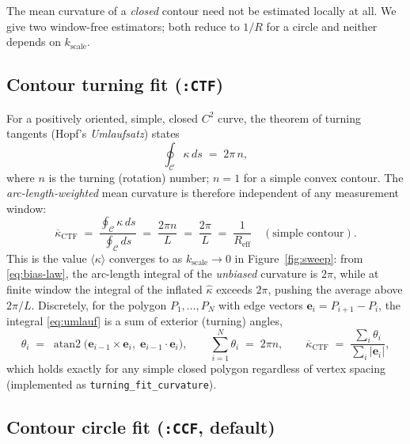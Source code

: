 \documentclass[11pt]{article}
\newcommand{\kbar}{\overline{\kappa}}
\newcommand{\code}[1]{\texttt{#1}}
\begin{document}
The mean curvature of a \emph{closed} contour need not be estimated locally at
all. We give two window-free estimators; both reduce to $1/R$ for a circle and
neither depends on $k_{\text{scale}}$.

\subsection{Contour turning fit (\texttt{:CTF})}
\label{sec:ctf}

For a positively oriented, simple, closed $C^2$ curve, the theorem of turning
tangents (Hopf's \emph{Umlaufsatz}) states
\begin{equation}
  \oint_{\mathcal{C}} \kappa \, ds \;=\; 2\pi\, n,
  \label{eq:umlauf}
\end{equation}
where $n$ is the turning (rotation) number; $n=1$ for a simple convex contour.
The \emph{arc-length-weighted} mean curvature is therefore independent of any
measurement window:
\begin{equation}
  \boxed{\;
  \kbar_{\text{CTF}} \;=\; \frac{\oint_{\mathcal{C}}\kappa\,ds}{\oint_{\mathcal{C}} ds}
        \;=\; \frac{2\pi n}{L}
        \;=\; \frac{2\pi}{L}
        \;=\; \frac{1}{R_{\text{eff}}}
  \quad(\text{simple contour}).
  \;}
  \label{eq:kbar}
\end{equation}
This is the value $\langle\kappa\rangle$ converges to as $k_{\text{scale}}\to 0$
in Figure~\ref{fig:sweep}: from \eqref{eq:bias-law}, the arc-length integral of
the \emph{unbiased} curvature is $2\pi$, while at finite window the integral of
the inflated $\widehat\kappa$ exceeds $2\pi$, pushing the average above $2\pi/L$.
Discretely, for the polygon $P_1,\dots,P_N$ with edge vectors
$\mathbf{e}_i = P_{i+1}-P_i$, the integral \eqref{eq:umlauf} is a sum of exterior
(turning) angles,
\begin{equation}
  \theta_i \;=\; \operatorname{atan2}\!\bigl(\mathbf{e}_{i-1}\times\mathbf{e}_i,\;
                                            \mathbf{e}_{i-1}\cdot\mathbf{e}_i\bigr),
  \qquad
  \sum_{i=1}^{N}\theta_i \;=\; 2\pi n,
  \qquad
  \kbar_{\text{CTF}} \;=\; \frac{\sum_i \theta_i}{\sum_i \lvert\mathbf{e}_i\rvert},
  \label{eq:kbar-discrete}
\end{equation}
which holds exactly for any simple closed polygon regardless of vertex spacing
(implemented as \code{turning\_fit\_curvature}).

\subsection{Contour circle fit (\texttt{:CCF}, default)}
\label{sec:ccf}
\end{document}
